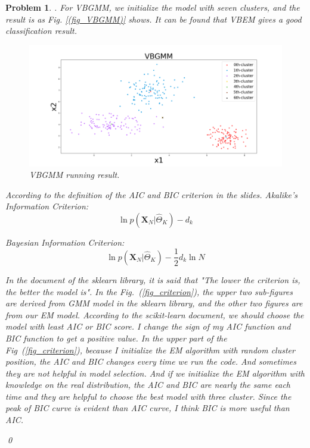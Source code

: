 \documentclass[12pt]{article}
\newtheorem{hw}{Problem}
\newenvironment{sol}
  {\par\vspace{3mm}\noindent{\it Solution}.}
  {\qed}
\newcommand{\Xv}{\boldsymbol{X}}
\begin{document}
\begin{hw}
\begin{sol}
	For VBGMM, we initialize the model with seven clusters, and the result is as Fig. \ref{(fig_VBGMM)} shows. It can be found that VBEM gives a good classification result.
	\begin{figure}[ht]
		\includegraphics[width=\linewidth]{./Figs/VBGMM.png}
		\caption{VBGMM running result.}
		\label{fig_VBGMM}
	\end{figure}
	
	According to the definition of the AIC and BIC criterion in the slides.
	Akalike's Information Criterion:
	$$\ln p(\Xv_N|\hat{\Theta}_K)-d_k$$
	
	Bayesian Information Criterion:
	$$\ln p(\Xv_N|\hat{\Theta}_K)-\frac{1}{2}d_k\ln N$$


	In the document of the sklearn library, it is said that "The lower the criterion is, the better the model is". In the Fig.~(\ref{fig_criterion}), the upper two sub-figures are derived from GMM model in the sklearn library, and the other two figures are from our EM model. According to the scikit-learn document, we should choose the model with least AIC or BIC score. I change the sign of my AIC function and BIC function to get a positive value. In the upper part of the Fig~(\ref{fig_criterion}), because I initialize the EM algorithm with random cluster position, the AIC and BIC changes every time we run the code. And sometimes they are not helpful in model selection. And if we initialize the EM algorithm with knowledge on the real distribution, the AIC and BIC are nearly the same each time and they are helpful to choose the best model with three cluster. Since the peak of BIC curve is evident than AIC curve, I think BIC is more useful than AIC.
	

\end{sol}
\end{hw}
\end{document}
